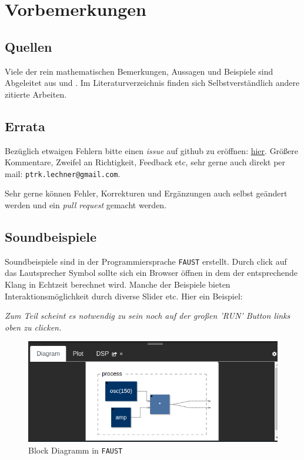 \chapter*{Vorbemerkungen}

\section*{Quellen}

Viele der rein mathematischen Bemerkungen, Aussagen und Beispiele sind Abgeleitet aus \cite{merziger2024repetitorium} und \cite{gollmann2017mathematik}. Im Literaturverzeichnis finden sich Selbstverständlich andere zitierte Arbeiten.

\section*{Errata}

Bezüglich etwaigen Fehlern bitte einen \emph{issue} auf github zu eröffnen: \href{https://github.com/hrtlacek/matheFuerTonmeisterinnen/issues}{hier}. Größere Kommentare, Zweifel an Richtigkeit, Feedback etc, sehr gerne auch direkt per mail: \texttt{ptrk.lechner@gmail.com}.

Sehr gerne können Fehler, Korrekturen und Ergänzungen auch selbst geändert werden und ein \emph{pull request} gemacht werden.

\section*{Soundbeispiele}

Soundbeispiele sind in der Programmiersprache \texttt{FAUST} erstellt. Durch click auf das Lautsprecher Symbol sollte sich ein Browser öffnen in dem der entsprechende Klang in Echtzeit berechnet wird. Manche der Beispiele bieten Interaktionsmöglichkeit durch diverse Slider etc. Hier ein Beispiel:


\emph{Zum Teil scheint es notwendig zu sein noch auf der großen 'RUN' Button links oben zu clicken.}

\begin{figure}[h!]
	\centering
	\includegraphics[width=0.8 \textwidth]{img/faust_diag.png}
	\caption{Block Diagramm in \texttt{FAUST}}
	\label{fig:faustBlock}
\end{figure}

